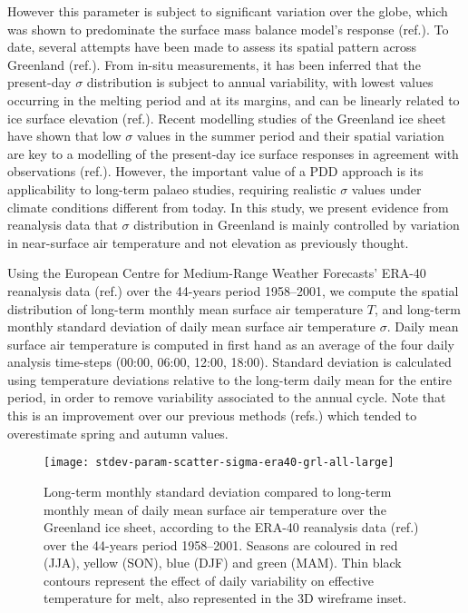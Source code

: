 \documentclass[review]{igs}
\begin{document}
However this parameter is subject to significant variation over the globe, which was shown to predominate the surface mass balance model’s response (ref.). To date, several attempts have been made to assess its spatial pattern across Greenland (ref.). From in-situ measurements, it has been inferred that the present-day $\sigma$ distribution is subject to annual variability, with lowest values occurring in the melting period and at its margins, and can be linearly related to ice surface elevation (ref.). Recent modelling studies of the Greenland ice sheet have shown that low $\sigma$ values in the summer period and their spatial variation are key to a modelling of the present-day ice surface responses in agreement with observations (ref.). However, the important value of a PDD approach is its applicability to long-term palaeo studies, requiring realistic $\sigma$ values under climate conditions different from today. In this study, we present evidence from reanalysis data that $\sigma$ distribution in Greenland is mainly controlled by variation in near-surface air temperature and not elevation as previously thought.

Using the European Centre for Medium-Range Weather Forecasts’ ERA-40 reanalysis data (ref.) over the 44-years period 1958–2001, we compute the spatial distribution of long-term monthly mean surface air temperature $T$, and long-term monthly standard deviation of daily mean surface air temperature $\sigma$. Daily mean surface air temperature is computed in first hand as an average of the four daily analysis time-steps (00:00, 06:00, 12:00, 18:00). Standard deviation is calculated using temperature deviations relative to the long-term daily mean for the entire period, in order to remove variability associated to the annual cycle. Note that this is an improvement over our previous methods (refs.) which tended to overestimate spring and autumn values.

\begin{figure*}
    \centering\texttt{[image: stdev-param-scatter-sigma-era40-grl-all-large]}
    \caption{Long-term monthly standard deviation compared to long-term monthly mean of daily mean surface air temperature over the Greenland ice sheet, according to the ERA-40 reanalysis data (ref.) over the 44-years period 1958–2001. Seasons are coloured in red (JJA), yellow (SON), blue (DJF) and green (MAM). Thin black contours represent the effect of daily variability on effective temperature for melt, also represented in the 3D wireframe inset.}
    \label{fig:grl}
\end{figure*}
\end{document}

